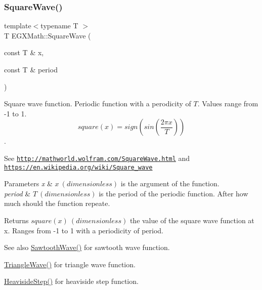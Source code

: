 \subsubsection{\texorpdfstring{Square\+Wave()}{SquareWave()}}
{\footnotesize\ttfamily template$<$typename T $>$ \\
T E\+G\+X\+Math\+::\+Square\+Wave (\begin{DoxyParamCaption}\item[{const T \&}]{x,  }\item[{const T \&}]{period }\end{DoxyParamCaption})}



Square wave function. Periodic function with a perodicity of $T$. Values range from -\/1 to 1. \[square(x)= sign( sin (\frac{2 \pi x}{T})) \]. 

See \href{http://mathworld.wolfram.com/SquareWave.html}{\tt http\+://mathworld.\+wolfram.\+com/\+Square\+Wave.\+html} and \href{https://en.wikipedia.org/wiki/Square_wave}{\tt https\+://en.\+wikipedia.\+org/wiki/\+Square\+\_\+wave} 
\begin{DoxyParams}{Parameters}
{\em x} & $x\ (dimensionless)$ is the argument of the function. \\
\hline
{\em period} & $T\ (dimensionless)$ is the period of the periodic function. After how much should the function repeate. \\
\hline
\end{DoxyParams}
\begin{DoxyReturn}{Returns}
$square(x)\ (dimensionless)$ the value of the square wave function at x. Ranges from -\/1 to 1 with a periodicity of period. 
\end{DoxyReturn}
\begin{DoxySeeAlso}{See also}
\mbox{\hyperlink{group___e_g_x_math-_functions-_periodic_ga3eab4a0455f64881f9c183987682d85c}{Sawtooth\+Wave()}} for sawtooth wave function. 

\mbox{\hyperlink{group___e_g_x_math-_functions-_periodic_gafa81ebd66ef7cd080370fad972d6ac50}{Triangle\+Wave()}} for triangle wave function. 

\mbox{\hyperlink{group___e_g_x_math-_functions-_periodic_ga0fb325d5423606e9c222e1ebd6a65833}{Heaviside\+Step()}} for heaviside step function. 
\end{DoxySeeAlso}
\mbox{\label{group___e_g_x_math-_functions-_periodic_gafa81ebd66ef7cd080370fad972d6ac50}} 
